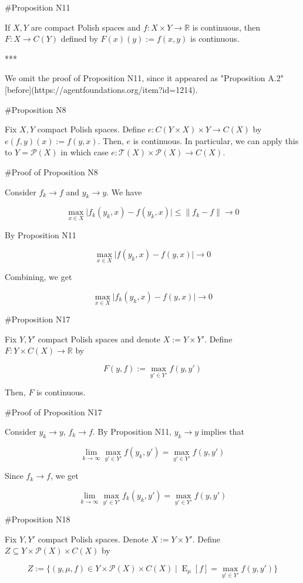 \documentclass[a4paper]{article}
\DeclareMathOperator{\E}{E}
\newcommand{\Reals}{\mathbb{R}}
\newcommand{\Abs}[1]{\lvert #1 \rvert}
\newcommand{\Norm}[1]{\lVert #1 \rVert}
\newcommand{\Prob}{\mathcal{P}}
\newcommand{\T}{\mathcal{T}}
\begin{document}
\#Proposition N11

If ${X,Y}$ are compact Polish spaces and ${f: X \times Y \rightarrow \Reals}$ is continuous, then ${F: X \rightarrow C(Y)}$ defined by ${F(x)(y):=f(x,y)}$ is continuous.

***

We omit the proof of Proposition N11, since it appeared as "Proposition A.2" [before](https://agentfoundations.org/item?id=1214).

\#Proposition N8

Fix ${X,Y}$ compact Polish spaces. Define ${e: C(Y \times X) \times Y \rightarrow C(X)}$ by ${e(f,y)(x):=f(y,x)}$. Then, ${e}$ is continuous. In particular, we can apply this to ${Y = \Prob(X)}$ in which case ${e: \T(X) \times \Prob(X) \rightarrow C(X)}$.

\#Proof of Proposition N8

Consider ${f_k \rightarrow f}$ and ${y_k \rightarrow y}$. We have

$$\max_{x \in X} \Abs{f_k(y_k,x)-f(y_k,x)} \leq \Norm{f_k - f} \rightarrow 0$$

By Proposition N11

$$\max_{x \in X} \Abs{f(y_k,x)-f(y,x)} \rightarrow 0$$

Combining, we get

$$\max_{x \in X} \Abs{f_k(y_k,x)-f(y,x)} \rightarrow 0$$

\#Proposition N17

Fix ${Y,Y'}$ compact Polish spaces and denote ${X:=Y \times Y'}$. Define ${F: Y \times C(X) \rightarrow \Reals}$ by 

$${F(y,f):=\max_{y' \in Y'} f(y,y')}$$

Then, ${F}$ is continuous.

\#Proof of Proposition N17

Consider ${y_k \rightarrow y}$, ${f_k \rightarrow f}$. By Proposition N11, ${y_k \rightarrow y}$ implies that

$${\lim_{k \rightarrow \infty} \max_{y' \in Y'} f(y_k,y') = \max_{y' \in Y'} f(y,y')}$$

Since ${f_k \rightarrow f}$, we get

$${\lim_{k \rightarrow \infty} \max_{y' \in Y'} f_k(y_k,y') = \max_{y' \in Y'} f(y,y')}$$

\#Proposition N18

Fix ${Y,Y'}$ compact Polish spaces. Denote ${X:=Y \times Y'}$. Define ${Z \subseteq Y \times \Prob(X) \times C(X)}$ by

$$Z:=\{(y,\mu,f) \in Y \times \Prob(X) \times C(X) \mid \E_\mu[f] = \max_{y' \in Y'} f(y,y')\}$$
\end{document}
